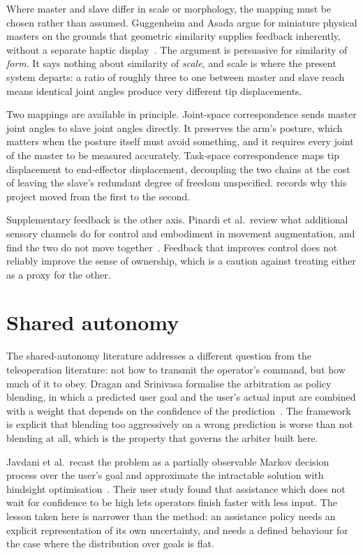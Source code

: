 Where master and slave differ in scale or morphology, the mapping must be
chosen rather than assumed. Guggenheim and Asada argue for miniature physical
masters on the grounds that geometric similarity supplies feedback
inherently, without a separate haptic display~\cite{guggenheim2021haptic}.
The argument is persuasive for similarity of \emph{form}. It says nothing
about similarity of \emph{scale}, and scale is where the present system
departs: a ratio of roughly three to one between master and slave reach means
identical joint angles produce very different tip displacements.

Two mappings are available in principle. Joint-space correspondence sends
master joint angles to slave joint angles directly. It preserves the arm's
posture, which matters when the posture itself must avoid something, and it
requires every joint of the master to be measured accurately. Task-space
correspondence maps tip displacement to end-effector displacement, decoupling
the two chains at the cost of leaving the slave's redundant degree of freedom
unspecified.  records why this project moved from the
first to the second.

Supplementary feedback is the other axis. Pinardi et al.\ review what
additional sensory channels do for control and embodiment in movement
augmentation, and find the two do not move
together~\cite{pinardi2023feedback}. Feedback that improves control does not
reliably improve the sense of ownership, which is a caution against treating
either as a proxy for the other.

\section{Shared autonomy}

The shared-autonomy literature addresses a different question from the
teleoperation literature: not how to transmit the operator's command, but how
much of it to obey. Dragan and Srinivasa formalise the arbitration as policy
blending, in which a predicted user goal and the user's actual input are
combined with a weight that depends on the confidence of the
prediction~\cite{dragan2013policyblending}. The framework is explicit that
blending too aggressively on a wrong prediction is worse than not blending at
all, which is the property that governs the arbiter built here.

Javdani et al.\ recast the problem as a partially observable Markov decision
process over the user's goal and approximate the intractable solution with
hindsight optimisation~\cite{javdani2015hindsight}. Their user study found
that assistance which does not wait for confidence to be high lets operators
finish faster with less input. The lesson taken here is narrower than the
method: an assistance policy needs an explicit representation of its own
uncertainty, and needs a defined behaviour for the case where the
distribution over goals is flat.

